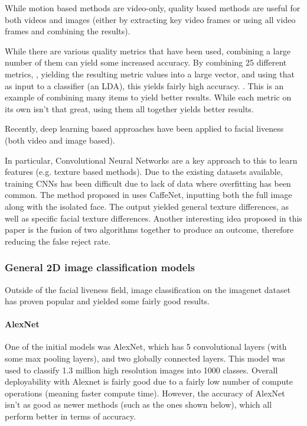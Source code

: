 \documentclass[10pt,a4paper]{article}
\begin{document}
        While motion based methods are video-only, quality based methods are useful for both videos and images (either by extracting key video frames or using all video frames and combining the results).

        While there are various quality metrics that have been used, combining a large number of them can yield some increased accuracy. By combining 25 different metrics,
        , yielding the resulting metric values into a large vector, and using that as input to a classifier (an LDA), this yields fairly high accuracy. \cite{ImageQualityAssessmentTest}.
        This is an example of combining many items to yield better results. While each metric on its own isn't that great, using them all together yields better results.
        
        Recently, deep learning based approaches have been applied to facial liveness (both video and image based).

        In particular, Convolutional Neural Networks are a key approach to this to learn features (e.g. texture based methods).
        Due to the existing datasets available, training CNNs has been difficult due to lack of data where overfitting has been common.
        The method proposed in \cite{Patel2016CrossDatabaseFA} uses CaffeNet, inputting both the full image along with the isolated face.
        The output yielded general texture differences, as well as specific facial texture differences. Another interesting idea proposed
        in this paper is the fusion of two algorithms together to produce an outcome, therefore reducing the false reject rate.
        
        \subsubsection{General 2D image classification models}
        Outside of the facial liveness field, image classification on the imagenet dataset has proven popular and yielded some fairly good
        results. 
        
        \paragraph{AlexNet} 
        One of the initial models was AlexNet, which has 5 convolutional layers (with some max pooling layers), and two globally connected layers.
        This model was used to classify 1.3 million high resolution images into 1000 classes. \cite{AlexNet} Overall deployability
        with Alexnet is fairly good due to a fairly low number of compute operations (meaning faster compute time). \cite{DeepNeuralNetworkDeployability} However, the accuracy of AlexNet isn't
        as good as newer methods (such as the ones shown below), which all perform better in terms of accuracy. 
        
\end{document}
